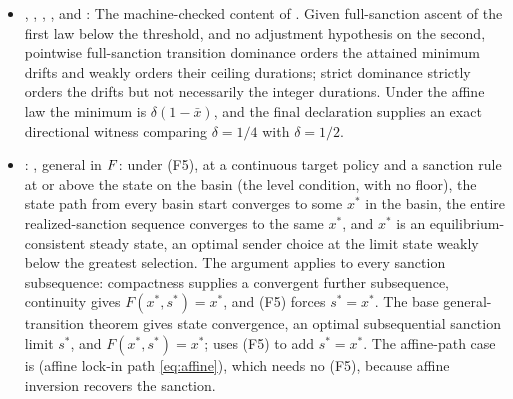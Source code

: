 \begin{itemize}[leftmargin=1.4em,itemsep=1pt]
The quantitative general-$F$ construction behind thm:shock.
Continuity and (F5) produce an attained positive minimum drift
$\eta_{\F}(\bar x)$ on the compact pre-basin interval. The worst-case
path from zero grows by at least this amount before entry, giving the
uniform bound $\widehat N_{\F}(\bar x)=
\lceil\bar x/\eta_{\F}(\bar x)\rceil$ and equilibrium persistence after
entry.  separately retains the sharper
affine formula $N_*(\bar x,\delta)$, stated without initial-state bounds, which
its proof never read ( is an
alias).
\item
{},
,
,
, and
:
The machine-checked content of
. Given full-sanction ascent of the
first law below the threshold, and no adjustment hypothesis on the second,
pointwise full-sanction
transition dominance orders the attained minimum drifts and weakly
orders their ceiling durations; strict dominance strictly orders the
drifts but not necessarily the integer durations. Under the affine law
the minimum is $\delta(1-\bar x)$, and the final declaration supplies
an exact directional witness comparing $\delta=1/4$ with $\delta=1/2$.
\item {}: , general in $F$: under (F5), at a continuous target policy and a sanction rule at or above the state on the basin (the level condition, with no floor), the state path from every basin start converges to some $x^*$ in the basin, the entire realized-sanction sequence converges to the same $x^*$, and $x^*$ is an equilibrium-consistent steady state, an optimal sender choice at the limit state weakly below the greatest selection. The argument applies to every sanction subsequence: compactness supplies a convergent further subsequence, continuity gives $F(x^*,s^*)=x^*$, and (F5) forces $s^*=x^*$. The base general-transition theorem  gives state convergence, an optimal subsequential sanction limit $s^*$, and $F(x^*,s^*)=x^*$;  uses (F5) to add $s^*=x^*$. The affine-path case is  (affine lock-in path \eqref{eq:affine}), which needs no (F5), because affine inversion recovers the sanction.

\end{itemize}
